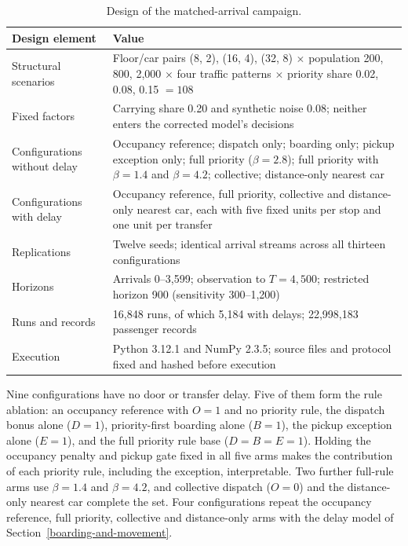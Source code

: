 \begin{table}[htbp]\centering
\caption{Design of the matched-arrival campaign.}\label{tab:design}
\small\begin{tabular}{@{}p{.28\linewidth}p{.66\linewidth}@{}}
\toprule Design element & Value\\\midrule
Structural scenarios & Floor/car pairs (8, 2), (16, 4), (32, 8) $\times$ population 200, 800, 2,000 $\times$ four traffic patterns $\times$ priority share 0.02, 0.08, 0.15 $=108$\\
Fixed factors & Carrying share 0.20 and synthetic noise 0.08; neither enters the corrected model's decisions\\
Configurations without delay & Occupancy reference; dispatch only; boarding only; pickup exception only; full priority ($\beta=2.8$); full priority with $\beta=1.4$ and $\beta=4.2$; collective; distance-only nearest car\\
Configurations with delay & Occupancy reference, full priority, collective and distance-only nearest car, each with five fixed units per stop and one unit per transfer\\
Replications & Twelve seeds; identical arrival streams across all thirteen configurations\\
Horizons & Arrivals 0--3,599; observation to $T=4{,}500$; restricted horizon 900 (sensitivity 300--1,200)\\
Runs and records & 16,848 runs, of which 5,184 with delays; 22,998,183 passenger records\\
Execution & Python 3.12.1 and NumPy 2.3.5; source files and protocol fixed and hashed before execution\\
\bottomrule
\end{tabular}
\end{table}

Nine configurations have no door or transfer delay. Five of them form the rule ablation: an occupancy reference with $O=1$ and no priority rule, the dispatch bonus alone ($D=1$), priority-first boarding alone ($B=1$), the pickup exception alone ($E=1$), and the full priority rule base ($D=B=E=1$). Holding the occupancy penalty and pickup gate fixed in all five arms makes the contribution of each priority rule, including the exception, interpretable. Two further full-rule arms use $\beta=1.4$ and $\beta=4.2$, and collective dispatch ($O=0$) and the distance-only nearest car complete the set. Four configurations repeat the occupancy reference, full priority, collective and distance-only arms with the delay model of Section~\ref{boarding-and-movement}.


